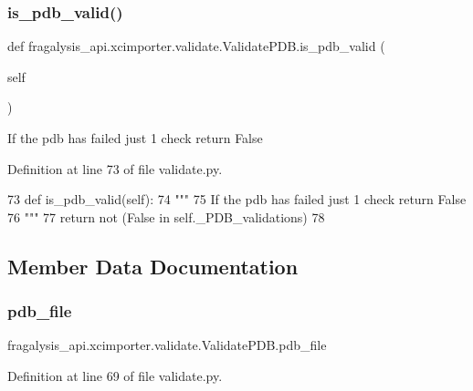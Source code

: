 \subsubsection{\texorpdfstring{is\+\_\+pdb\+\_\+valid()}{is\_pdb\_valid()}}
{\footnotesize\ttfamily def fragalysis\+\_\+api.\+xcimporter.\+validate.\+Validate\+P\+D\+B.\+is\+\_\+pdb\+\_\+valid (\begin{DoxyParamCaption}\item[{}]{self }\end{DoxyParamCaption})}

\begin{DoxyVerb}If the pdb has failed just 1 check return False
\end{DoxyVerb}
 

Definition at line 73 of file validate.\+py.


\begin{DoxyCode}
73     \textcolor{keyword}{def }is\_pdb\_valid(self):
74         \textcolor{stringliteral}{"""}
75 \textcolor{stringliteral}{        If the pdb has failed just 1 check return False}
76 \textcolor{stringliteral}{        """}
77         \textcolor{keywordflow}{return} \textcolor{keywordflow}{not} (\textcolor{keyword}{False} \textcolor{keywordflow}{in} self.\_PDB\_validations)
78 
\end{DoxyCode}


\subsection{Member Data Documentation}
\mbox{\label{classfragalysis__api_1_1xcimporter_1_1validate_1_1_validate_p_d_b_a9c42b0ed963d65498056ac184793b0f0}} 
\subsubsection{\texorpdfstring{pdb\+\_\+file}{pdb\_file}}
{\footnotesize\ttfamily fragalysis\+\_\+api.\+xcimporter.\+validate.\+Validate\+P\+D\+B.\+pdb\+\_\+file}



Definition at line 69 of file validate.\+py.

